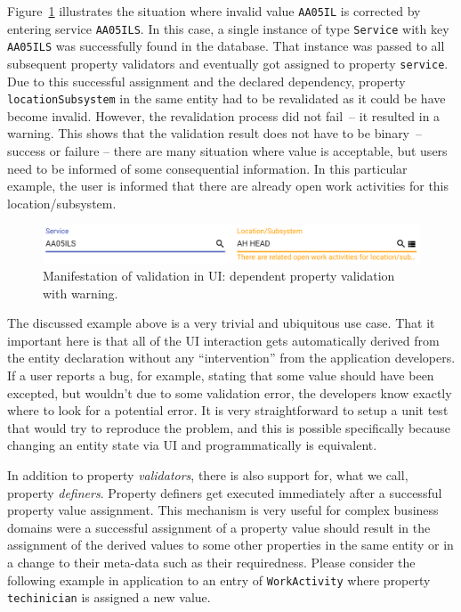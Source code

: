 \documentclass[a4paper,12pt,oneside,openright,final]{memoir} %
\begin{document}
	Figure~\ref{fig:dependent-validation} illustrates the situation where invalid value \texttt{AA05IL} is corrected by entering service \texttt{AA05ILS}.
	In this case, a single instance of type \texttt{Service} with key \texttt{AA05ILS} was successfully found in the database.
	That instance was passed to all subsequent property validators and eventually got assigned to property \texttt{service}.
	Due to this successful assignment and the declared dependency, property \texttt{locationSubsystem} in the same entity had to be revalidated as it could be have become invalid.
	However, the revalidation process did not fail~-- it resulted in a warning.
	This shows that the validation result does not have to be binary~-- success or failure -- there are many situation where value is acceptable, but users need to be informed of some consequential information.
	In this particular example, the user is informed that there are already open work activities for this location/subsystem.	
	
	\begin{figure}[!h]
  		\centering
      	\includegraphics[width=1.0\textwidth]{images/03-wa-dependent-props.png}  
   	  	\caption{Manifestation of validation in UI: dependent property validation with warning.}
   		\label{fig:dependent-validation}
  	\end{figure}

	The discussed example above is a very trivial and ubiquitous use case.
	That it important here is that all of the UI interaction gets automatically derived from the entity declaration without any ``intervention'' from the application developers.
	If a user reports a bug, for example, stating that some value should have been excepted, but wouldn't due to some validation error, the developers know exactly where to look for a potential error.
	It is very straightforward to setup a unit test that would try to reproduce the problem, and this is possible specifically because changing an entity state via UI and programmatically is equivalent.
	
	\vspace{8pt}
	In addition to property \emph{validators}, there is also support for, what we call, property \emph{definers}.
	Property definers get executed immediately after a successful property value assignment.
	This mechanism is very useful for complex business domains were a successful assignment of a property value should result in the assignment of the derived values to some other properties in the same entity or in a change to their meta-data such as their requiredness.
	Please consider the following example in application to an entry of \texttt{WorkActivity} where property \texttt{techinician} is assigned a new value.
	
\end{document}
